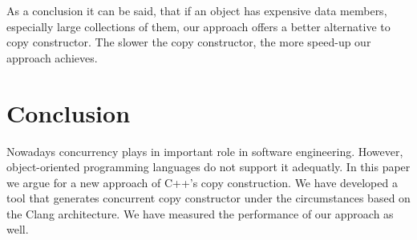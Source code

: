 \documentclass{article}
\begin{document}
As a conclusion it can be said, that if an object has expensive data members, especially large collections of them, our approach offers a better alternative to copy constructor.
The slower the copy constructor, the more speed-up our approach achieves.

\section{Conclusion}
\label{conc}

Nowadays concurrency plays in important role in software engineering. However,
object-oriented programming languages do not support it adequatly. In this
paper we argue for a new approach of C++'s copy construction. We have developed
a tool that generates concurrent copy constructor under the circumstances based
on the Clang architecture. We have measured the performance of our approach as
well.
\end{document}
